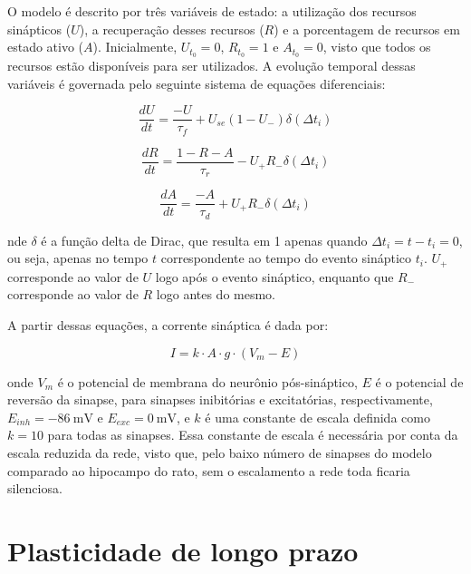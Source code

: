 O modelo é descrito por três variáveis de estado: a utilização dos recursos sinápticos ($U$), a recuperação desses recursos ($R$)
e a porcentagem de recursos em estado ativo ($A$). Inicialmente, $U_{t_0} = 0$, $R_{t_0} = 1$ e $A_{t_0} = 0$, 
visto que todos os recursos estão disponíveis para ser utilizados. A evolução temporal dessas
variáveis é governada pelo seguinte sistema de equações diferenciais:

\begin{equation}
    \label{eq_tsodyks_dU}
    \frac{dU}{dt} = \frac{-U}{\tau_f} + U_{se}(1-U_{-}) \delta(\Delta t_i)
\end{equation}

\begin{equation}
    \label{eq_tsodyks_dR}
    \frac{dR}{dt} = \frac{1-R-A}{\tau_r} - U_{+} R_{-} \delta(\Delta t_i)
\end{equation}

\begin{equation}
    \label{eq_tsodyks_dA}
    \frac{dA}{dt} = \frac{-A}{\tau_d} + U_{+} R_{-} \delta(\Delta t_i)
\end{equation}

nde $\delta$ é a função delta de Dirac, que resulta em 1 apenas quando $\Delta t_i = t - t_i = 0$, ou seja, apenas no tempo $t$
correspondente ao tempo do evento sináptico $t_i$. $U_{+}$ corresponde ao valor de $U$ logo após o evento sináptico, enquanto que
$R_{-}$ corresponde ao valor de $R$ logo antes do mesmo.

A partir dessas equações, a corrente sináptica é dada por:

\begin{equation}
    \label{eq_tsodyks_I}
    I = k \cdot A \cdot g \cdot (V_m - E)
\end{equation}

onde $V_m$ é o potencial de membrana do neurônio pós-sináptico, $E$ é o potencial de reversão da sinapse, para sinapses
inibitórias e excitatórias, respectivamente, $E_{inh} = \SI{-86}{\milli\volt}$ e $E_{exc} = \SI{0}{\milli\volt}$, e $k$
é uma constante de escala definida como $k = 10$ para todas as sinapses. Essa constante de escala é necessária por conta
da escala reduzida da rede, visto que, pelo baixo número de sinapses do modelo comparado ao hipocampo do rato, sem o 
escalamento a rede toda ficaria silenciosa.





\section{Plasticidade de longo prazo}

